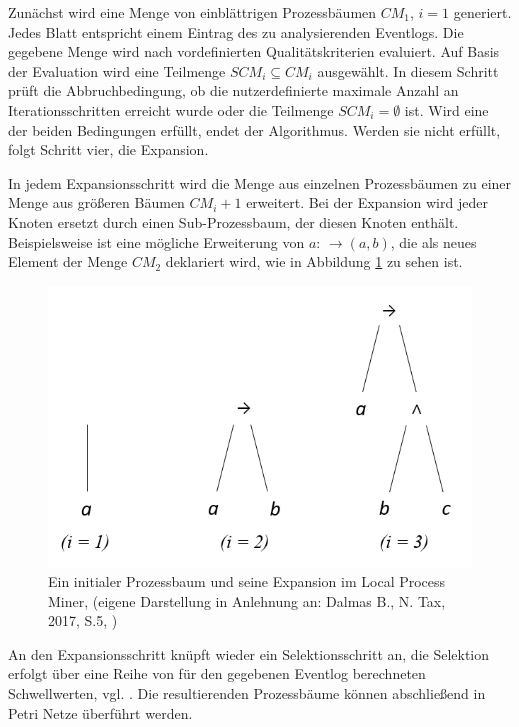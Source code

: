 Zunächst wird eine Menge von einblättrigen Prozessbäumen $CM_1$, $i=1$ generiert. Jedes Blatt entspricht einem Eintrag des zu analysierenden Eventlogs. Die gegebene Menge wird nach vordefinierten Qualitätskriterien evaluiert. Auf Basis der Evaluation wird eine Teilmenge $SCM_i \subseteq CM_i$ ausgewählt. In diesem Schritt prüft die Abbruchbedingung, ob die nutzerdefinierte maximale Anzahl an Iterationsschritten erreicht wurde oder die Teilmenge $SCM_i=∅$  ist. Wird eine der beiden Bedingungen erfüllt, endet der Algorithmus. Werden sie nicht erfüllt, folgt Schritt vier, die Expansion. 

In jedem Expansionsschritt wird die Menge aus einzelnen Prozessbäumen zu einer Menge aus größeren Bäumen $CM_i+1$ erweitert. Bei der Expansion wird jeder Knoten ersetzt durch einen Sub-Prozessbaum, der diesen Knoten enthält. Beispielsweise ist eine mögliche Erweiterung von $a$: $ →(a,b)$, die als neues Element der Menge $CM_2$ deklariert wird, wie in Abbildung \ref{fig:lpmExample} zu sehen ist. 
\begin{figure}[!h]
    \centering
    \includegraphics[scale=0.4]{figures/Appbildungen/lpm_example.PNG}
    \caption{Ein initialer Prozessbaum und seine Expansion im Local Process Miner, (eigene Darstellung in Anlehnung an: Dalmas B., N. Tax, 2017, S.5, \cite{lpm}) }
    \label{fig:lpmExample}
\end{figure}

An den Expansionsschritt knüpft wieder ein Selektionsschritt an, die Selektion erfolgt über eine Reihe von für den gegebenen Eventlog berechneten Schwellwerten, vgl. \cite{lpm}. Die resultierenden Prozessbäume können abschließend in Petri Netze überführt werden.

